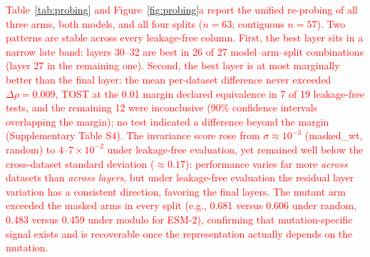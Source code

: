 \documentclass[11pt,a4paper]{article}
\newcommand{\revised}[1]{\textcolor{red}{#1}}
\begin{document}
\revised{Table~\ref{tab:probing} and Figure~\ref{fig:probing}a report the unified
re-probing of all three arms,
both models, and all four splits ($n = 63$; contiguous $n = 57$). Two patterns are
stable across every leakage-free column. First, the best layer sits in a narrow late
band: layers 30--32 are best in 26 of 27 model--arm--split combinations (layer 27 in
the remaining one). Second, the best layer is at most marginally better than the
final layer: the mean per-dataset difference never exceeded $\Delta\rho = 0.009$,
TOST at the 0.01 margin declared equivalence in 7 of 19 leakage-free tests, and the
remaining 12 were inconclusive (90\% confidence intervals overlapping the margin); no
test indicated a difference beyond the margin (Supplementary Table S4). The
invariance score rose from $\sigma \approx 10^{-3}$ (masked\_wt, random) to
$4$--$7 \times 10^{-2}$ under leakage-free evaluation, yet remained well below the
cross-dataset standard deviation ($\approx 0.17$): performance varies far more
\emph{across} datasets than \emph{across layers}, but under leakage-free evaluation
the residual layer variation has a consistent direction, favoring the final layers.
The mutant arm exceeded the masked arms in every split (e.g., 0.681 versus 0.606
under random, 0.483 versus 0.459 under modulo for ESM-2), confirming that
mutation-specific signal exists and is recoverable once the representation actually
depends on the mutation.}
\end{document}
